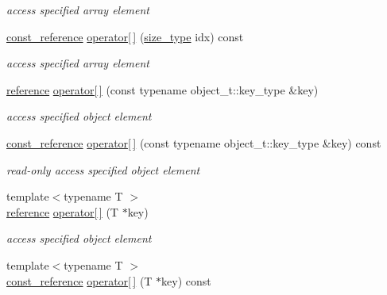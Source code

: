\begin{DoxyCompactItemize}
\begin{DoxyCompactList}\small\item\em access specified array element \end{DoxyCompactList}\item 
\hyperlink{classnlohmann_1_1basic__json_a4057c5425f4faacfe39a8046871786ca}{const\+\_\+reference} \hyperlink{classnlohmann_1_1basic__json_a2a3510a08418e8371ad3a67a33d3ce5d}{operator\mbox{[}$\,$\mbox{]}} (\hyperlink{classnlohmann_1_1basic__json_a39f2cd0b58106097e0e67bf185cc519b}{size\+\_\+type} idx) const 
\begin{DoxyCompactList}\small\item\em access specified array element \end{DoxyCompactList}\item 
\hyperlink{classnlohmann_1_1basic__json_ac6a5eddd156c776ac75ff54cfe54a5bc}{reference} \hyperlink{classnlohmann_1_1basic__json_a233b02b0839ef798942dd46157cc0fe6}{operator\mbox{[}$\,$\mbox{]}} (const typename object\+\_\+t\+::key\+\_\+type \&key)
\begin{DoxyCompactList}\small\item\em access specified object element \end{DoxyCompactList}\item 
\hyperlink{classnlohmann_1_1basic__json_a4057c5425f4faacfe39a8046871786ca}{const\+\_\+reference} \hyperlink{classnlohmann_1_1basic__json_a9460a6884381a351c04ef04e8778c505}{operator\mbox{[}$\,$\mbox{]}} (const typename object\+\_\+t\+::key\+\_\+type \&key) const 
\begin{DoxyCompactList}\small\item\em read-\/only access specified object element \end{DoxyCompactList}\item 
{\footnotesize template$<$typename T $>$ }\\\hyperlink{classnlohmann_1_1basic__json_ac6a5eddd156c776ac75ff54cfe54a5bc}{reference} \hyperlink{classnlohmann_1_1basic__json_abb8eaa633584b5aff9c8fcd242f25ca8}{operator\mbox{[}$\,$\mbox{]}} (T $\ast$key)
\begin{DoxyCompactList}\small\item\em access specified object element \end{DoxyCompactList}\item 
{\footnotesize template$<$typename T $>$ }\\\hyperlink{classnlohmann_1_1basic__json_a4057c5425f4faacfe39a8046871786ca}{const\+\_\+reference} \hyperlink{classnlohmann_1_1basic__json_a9dbbd81134838cac9616701501934e22}{operator\mbox{[}$\,$\mbox{]}} (T $\ast$key) const 

\end{DoxyCompactItemize}
